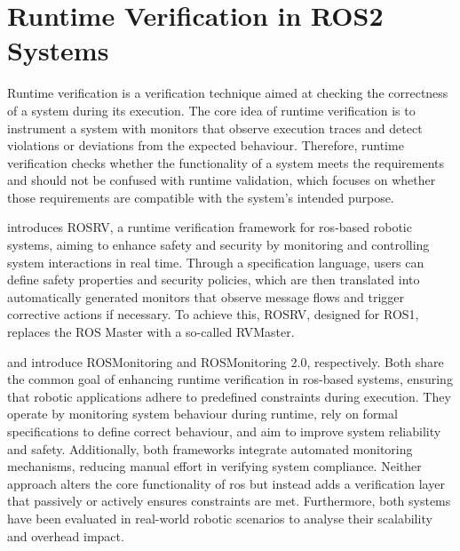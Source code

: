 \section{Runtime Verification in ROS2 Systems} \label{sec:RVinROS2}
Runtime verification is a verification technique aimed at checking the correctness of a system during its execution. The core idea of runtime verification is to instrument a system with monitors that observe execution traces and detect violations or deviations from the expected behaviour. Therefore, runtime verification checks whether the functionality of a system meets the requirements and should not be confused with runtime validation, which focuses on whether those requirements are compatible with the system's intended purpose.

\Textcite{ROSRV} introduces ROSRV, a runtime verification framework for \ac{ros}-based robotic systems, aiming to enhance safety and security by monitoring and controlling system interactions in real time. Through a specification language, users can define safety properties and security policies, which are then translated into automatically generated monitors that observe message flows and trigger corrective actions if necessary. To achieve this, ROSRV, designed for ROS1, replaces the ROS Master with a so-called RVMaster.

\Textcite{ROSMonitoring} and \Textcite{ROSMonitoring2.0} introduce ROSMonitoring and ROSMonitoring 2.0, respectively. Both share the common goal of enhancing runtime verification in \ac{ros}-based systems, ensuring that robotic applications adhere to predefined constraints during execution. They operate by monitoring system behaviour during runtime, rely on formal specifications to define correct behaviour, and aim to improve system reliability and safety. Additionally, both frameworks integrate automated monitoring mechanisms, reducing manual effort in verifying system compliance. Neither approach alters the core functionality of \ac{ros} but instead adds a verification layer that passively or actively ensures constraints are met. Furthermore, both systems have been evaluated in real-world robotic scenarios to analyse their scalability and overhead impact.


